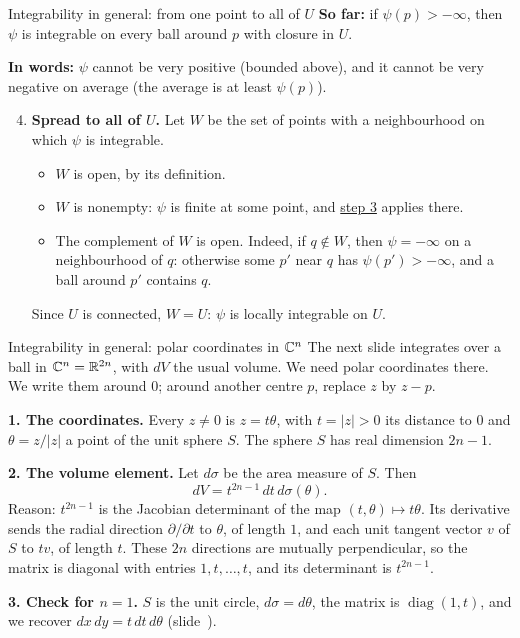 \begin{frame}{Integrability in general: from one point to all of \(U\)}
\textbf{So far:} if \(\psi(p)>-\infty\), then \(\psi\) is integrable on every ball around \(p\) with closure in \(U\).
\par\smallskip
\textbf{In words:} \(\psi\) cannot be very positive (bounded above), and it cannot be very negative on average (the average is at least \(\psi(p)\)).
\par\medskip
\begin{enumerate}
\setcounter{enumi}{3}
\item \textbf{Spread to all of \(U\).} Let \(W\) be the set of points with a neighbourhood on which \(\psi\) is integrable. \begin{itemize}
\item \(W\) is open, by its definition.
\item \(W\) is nonempty: \(\psi\) is finite at some point, and \hyperlink{fr:psh-integrable}{step 3} applies there.
\item The complement of \(W\) is open. Indeed, if \(q\notin W\), then \(\psi=-\infty\) on a neighbourhood of \(q\): otherwise some \(p'\) near \(q\) has \(\psi(p')>-\infty\), and a ball around \(p'\) contains \(q\). 
\end{itemize}
Since \(U\) is connected, \(W=U\): \(\psi\) is locally integrable on \(U\).
\end{enumerate}
\end{frame}

\begin{frame}{Integrability in general: polar coordinates in \(\mathbb C^n\)}
\label{fr:polar-cn}
The next slide integrates over a ball in \(\mathbb C^n=\mathbb R^{2n}\), with \(dV\) the usual volume. We need polar coordinates there. We write them around \(0\); around another centre \(p\), replace \(z\) by \(z-p\).
\par\medskip
\textbf{1. The coordinates.} Every \(z\ne0\) is \(z=t\theta\), with \(t=|z|>0\) its distance to \(0\) and \(\theta=z/|z|\) a point of the unit sphere \(S\). The sphere \(S\) has real dimension \(2n-1\).
\par\medskip
\textbf{2. The volume element.} Let \(d\sigma\) be the area measure of \(S\). Then
\[
\boxed{dV=t^{2n-1}\,dt\,d\sigma(\theta).}
\]
Reason: \(t^{2n-1}\) is the Jacobian determinant of the map \((t,\theta)\mapsto t\theta\). Its derivative sends the radial direction \(\partial/\partial t\) to \(\theta\), of length \(1\), and each unit tangent vector \(v\) of \(S\) to \(tv\), of length \(t\). These \(2n\) directions are mutually perpendicular, so the matrix is diagonal with entries \(1,t,\ldots,t\), and its determinant is \(t^{2n-1}\).
\par\medskip
\textbf{3. Check for \(n=1\).} \(S\) is the unit circle, \(d\sigma=d\theta\), the matrix is \(\operatorname{diag}(1,t)\), and we recover \(dx\,dy=t\,dt\,d\theta\) (slide~\hyperlink{fr:polar-coordinates-dx-dy-38}{\pageref{fr:polar-coordinates-dx-dy-38}}).
\end{frame}

